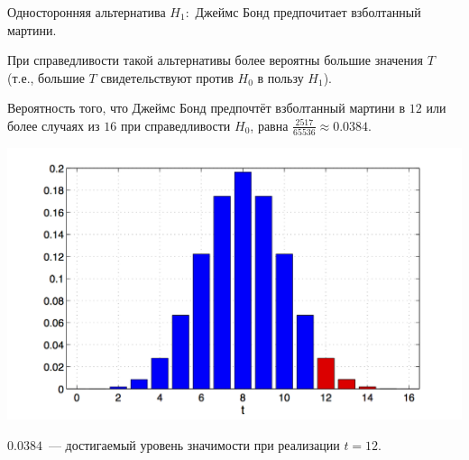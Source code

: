 \documentclass[9pt,pdf,utf8,hyperref={unicode},aspectratio=169]{beamer}
\begin{document}
\begin{frame}{Односторонняя альтернатива}
	$H_1\colon$ Джеймс Бонд предпочитает взболтанный мартини.
	
	При справедливости такой альтернативы более вероятны большие значения $T$ (т.е., большие $T$ свидетельствуют против $H_0$ в пользу $H_1$).
	
	Вероятность того, что Джеймс Бонд предпочтёт взболтанный мартини в $12$ или более случаях из $16$ при справедливости $H_0$, равна $\frac{2517}{65536}\approx 0.0384$.
	\begin{center}
		\includegraphics[height=0.6\textheight]{bond2.png}
	\end{center}
	$0.0384$~--- достигаемый уровень значимости при реализации $t=12$.
\end{frame}
\end{document}
